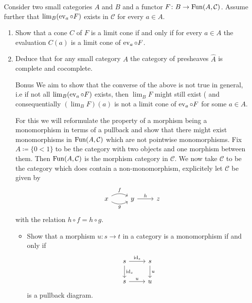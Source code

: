 \begin{Exercise}
    Consider two small categories $ A $ and $ B $ and a functor $ F \colon B \to \operatorname{Fun} ( A , \mathcal{ C } ) $. Assume further that $ \lim_B ( \operatorname{ev}_a \circ F ) $ exists in $ \mathcal{ C } $ for every $ a \in A $.
    
    \begin{enumerate}[label=(\alph*)]
        \item 
        Show that a cone $ C $ of $ F $ is a limit cone if and only if for every $ a \in A $
        the evaluation $  C ( a ) $ is a limit cone of $ \operatorname{ev}_a \circ F $.
    
        \item 
        Deduce that for any small category $ A $ the category of presheaves $ \widehat{ A } $ is complete and cocomplete.
    
        \item 
        [Bonus] 
        We aim to show that the converse of the above is not true in general, i.e if not all
        $ \lim_B ( \operatorname{ev}_a \circ F ) $ exists, then $ \lim_B F $ might still exist ( and consequentially $( \lim_B F ) ( a ) $ is not a limit cone of $ \operatorname{ev}_a \circ F $ for some $ a \in A $.
    
        For this we will reformulate the property of a morphism being a monomorphism in terms of a pullback and show that there might exist monomorphisms in $ \operatorname{Fun} ( A , \mathcal{ C } )$ which are not pointwise monomorphisms. Fix $ A  \coloneqq \{ 0 < 1 \} $ to be the category with two objects and one morphism between them.
        Then $ \operatorname{Fun} ( A , \mathcal{ C } ) $ is the morphism category in $ \mathcal{ C } $.
        We now take $ \mathcal{ C } $ to be the category which does contain a non-monomorphism, explicitely let $ \mathcal{ C }$ be given by
        \[
        \begin{tikzcd}
            x 
            \ar[r, bend left, "f"]
            \ar[r, bend right, "g"']
            &
            y
            \ar[r, "h"]
            &
            z
        \end{tikzcd}
        \]
        with the relation $ h \circ f = h \circ g$.
        \begin{itemize}
            \item 
            Show that a morphism $ u \colon s \to t $ in a category is a monomorphism if and only if 
            \[
            \begin{tikzcd}
                s 
                \ar[d, "\id_s"]
                \ar[r, "\id_s"]
                &
                s
                \ar[d, "u"]
                \\
                s 
                \ar[r, "u"]
                & 
                u
            \end{tikzcd}
            \]
            is a pullback diagram.
    

\end{itemize}
\end{enumerate}
\end{Exercise}
